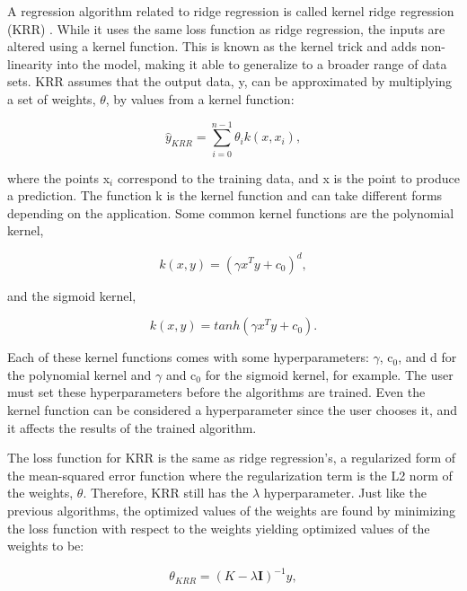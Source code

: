 A regression algorithm related to ridge regression is called kernel ridge regression (KRR) \cite{Ref7, Ref11, Ref12}. While it uses the same loss function as ridge regression, the inputs are altered using a kernel function. This is known as the kernel trick and adds non-linearity into the model, making it able to generalize to a broader range of data sets. KRR assumes that the output data, y, can be approximated by multiplying a set of weights, $\theta$, by values from a kernel function:

\begin{equation} \label{krr_output}
    \hat{y}_{KRR} = \sum_{i=0}^{n-1} \theta_ik(x,x_i),
\end{equation}

where the points x$_{i}$ correspond to the training data, and x is the point to produce a prediction. The function k is the kernel function and can take different forms depending on the application. Some common kernel functions are the polynomial kernel,

\begin{equation} \label{polynomial_kernel}
    k(x, y) = (\gamma x^Ty + c_0)^d,
\end{equation}

and the sigmoid kernel,

\begin{equation} \label{sigmoid_kernel}
    k(x,y) = tanh(\gamma x^Ty + c_0).
\end{equation}

Each of these kernel functions comes with some hyperparameters: $\gamma$, c$_0$, and d for the polynomial kernel and $\gamma$ and c$_0$ for the sigmoid kernel, for example. The user must set these hyperparameters before the algorithms are trained. Even the kernel function can be considered a hyperparameter since the user chooses it, and it affects the results of the trained algorithm.


The loss function for KRR is the same as ridge regression's, a regularized form of the mean-squared error function where the regularization term is the L2 norm of the weights, $\theta$. Therefore, KRR still has the $\lambda$ hyperparameter. Just like the previous algorithms, the optimized values of the weights are found by minimizing the loss function with respect to the weights yielding optimized values of the weights to be:

\begin{equation} \label{krr_optimized_weights}
    \theta_{KRR} = (K - \lambda\textbf{I})^{-1}y,
\end{equation}

